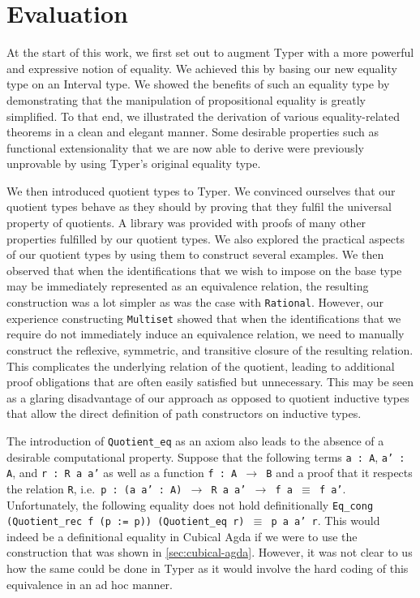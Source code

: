 \documentclass[12pt,twoside,maitrise]{dms}
\theoremstyle{definition}
\numberwithin{equation}{section}
\numberwithin{table}{chapter}
\numberwithin{figure}{chapter}
\newcommand\id[1] {\texttt{#1}}
\newcommand\fn[1] {\texttt{#1}}
\begin{document}
\chapter{Evaluation}

At the start of this work, we first set out to augment Typer with a more
powerful and expressive notion of equality. We achieved this by basing our new
equality type on an Interval type. We showed the benefits of such an equality
type by demonstrating that the manipulation of propositional equality is greatly
simplified. To that end, we illustrated the derivation of various
equality-related theorems in a clean and elegant manner. Some desirable
properties such as functional extensionality that we are now able to derive were
previously unprovable by using Typer's original equality type.

We then introduced quotient types to Typer. We convinced ourselves that our
quotient types behave as they should by proving that they fulfil the universal
property of quotients. A library was provided with proofs of many other
properties fulfilled by our quotient types. We also explored the practical
aspects of our quotient types by using them to construct several examples. We
then observed that when the identifications that we wish to impose on the base
type may be immediately represented as an equivalence relation, the resulting
construction was a lot simpler as was the case with \id{Rational}. However, our
experience constructing \id{Multiset} showed that when the identifications that
we require do not immediately induce an equivalence relation, we need to
manually construct the reflexive, symmetric, and transitive closure of the
resulting relation. This complicates the underlying relation of the quotient,
leading to additional proof obligations that are often easily satisfied but
unnecessary. This may be seen as a glaring disadvantage of our approach as
opposed to quotient inductive types that allow the direct definition of path
constructors on inductive types.

The introduction of \id{Quotient\_eq} as an axiom also leads to the absence of a
desirable computational property. Suppose that the following terms \fn{a : A},
\fn{a' : A}, and \fn{r : R a a'} as well as a function \fn{f : A $\rightarrow$
  B} and a proof that it respects the relation \id{R}, i.e.\ \fn{p : (a a' : A)
  $\rightarrow$ R a a' $\rightarrow$ f a $\equiv$ f a'}. Unfortunately, the
following equality does not hold definitionally \fn{Eq\_cong (Quotient\_rec f (p
  := p)) (Quotient\_eq r) $\equiv$ p a a' r}. This would indeed be a
definitional equality in Cubical Agda if we were to use the construction that
was shown in \autoref{sec:cubical-agda}. However, it was not clear to us how the
same could be done in Typer as it would involve the hard coding of this
equivalence in an ad hoc manner.
\end{document}
